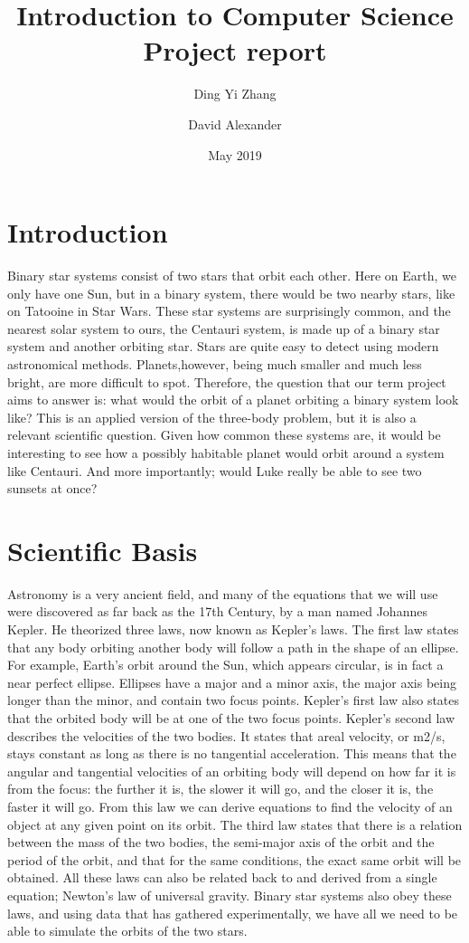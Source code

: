 \documentclass{article}
\title{Introduction to Computer Science\\ Project report}
\author{Ding Yi Zhang
\and David Alexander}
\date{May 2019}
\begin{document}
\maketitle

\section{Introduction}
Binary star systems consist of two stars that orbit each other. Here on Earth, we only have one Sun, but in a binary system, there would be two nearby stars, like on Tatooine in Star Wars. These star systems are surprisingly common, and the nearest solar system to ours, the Centauri system, is made up of a binary star system and another orbiting star. Stars are quite easy to detect using modern astronomical methods. Planets,however, being much smaller and much less bright, are more difficult to spot. Therefore, the question that our term project aims to answer is: what would the orbit of a planet orbiting a binary system look like? This is an applied version of the three-body problem, but it is also a relevant scientific question. Given how common these systems are, it would be interesting to see how a possibly habitable planet would orbit around a system like Centauri. And more importantly; would Luke really be able to see two sunsets at once?

\section{Scientific Basis}
Astronomy is a very ancient field, and many of the equations that we will use were discovered as far back as the 17th Century, by a man named Johannes Kepler. He theorized three laws, now known as Kepler’s laws. The first law states that any body orbiting another body will follow a path in the shape of an ellipse. For example, Earth’s orbit around the Sun, which appears circular, is in fact a near perfect ellipse. Ellipses have a major and a minor axis, the major axis being longer than the minor, and contain two focus points. Kepler’s first law also states that the orbited body will be at one of the two focus points. Kepler’s second law describes the velocities of the two bodies. It states that areal velocity, or m2/s, stays constant as long as there is no tangential acceleration. This means that the angular and tangential velocities of an orbiting body will depend on how far it is from the focus: the further it is, the slower it will go, and the closer it is, the faster it will go. From this law we can derive equations to find the velocity of an object at any given point on its orbit. The third law states that there is a relation between the mass of the two bodies, the semi-major axis of the orbit and the period of the orbit, and that for the same conditions, the exact same orbit will be obtained. All these laws can also be related back to and derived from a single equation; Newton’s law of universal gravity.  Binary star systems also obey these laws, and using data that has gathered experimentally, we have all we need to be able to simulate the orbits of the two stars.
\end{document}
